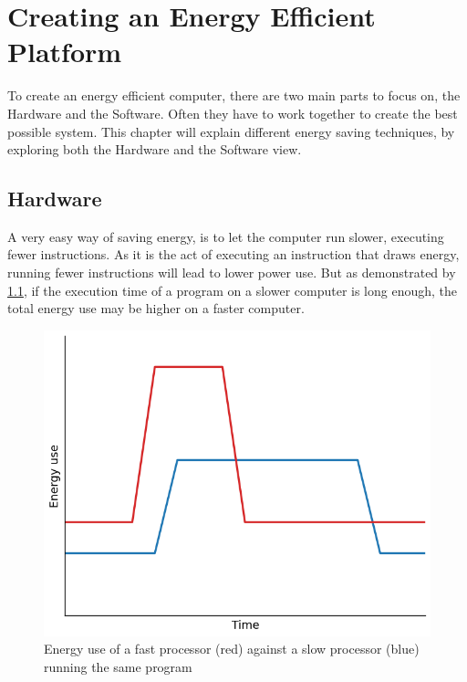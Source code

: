 \chapter{Creating an Energy Efficient Platform}
\label{chap:chapter2}

To create an energy efficient computer, there are two main parts to focus on, the Hardware and the Software.
Often they have to work together to create the best possible system.
This chapter will explain different energy saving techniques, by exploring both the Hardware and the Software view.

\section{Hardware}
\label{sec:hwenergy}
A very easy way of saving energy, is to let the computer run slower, executing fewer instructions.
As it is the act of executing an instruction that draws energy, running fewer instructions will lead to lower power use.
But as demonstrated by \cref{fig:energyusetime}, if the execution time of a program on a slower computer is long enough, the total energy use may be higher on a faster computer.

\begin{figure}[h]
\centering
\includegraphics[scale=0.5]{fig/graphs/energyusetime.png}
\caption{Energy use of a fast processor (red) against a slow processor (blue) running the same program}
\label{fig:energyusetime}
\end{figure}

